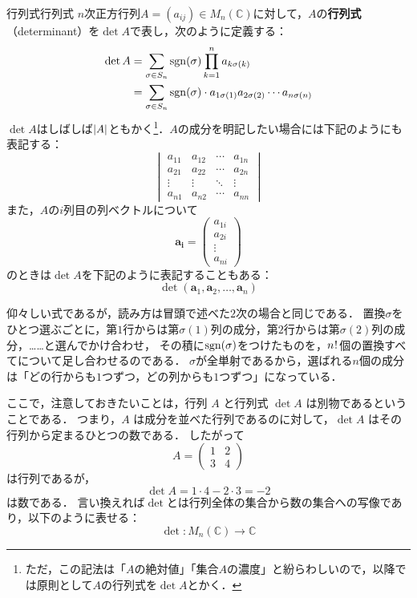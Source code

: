 \begin{definition}{行列式}{行列式}
  $n$次正方行列$A = (a_{ij}) \in M_n(\mathbb{C})$に対して，$A$の\textbf{行列式}（determinant）を$\det A $で表し，次のように定義する：
  \begin{align*}
  \det A &=\sum_{\sigma \in S_n} \sgn(\sigma) \prod_{k=1}^n a_{k\sigma(k)} \\
  &=  \sum_{\sigma \in S_n} \sgn(\sigma) \cdot a_{1\sigma(1)} a_{2\sigma(2)} \dotsm a_{n\sigma(n)}
  \end{align*}
  $\det A$はしばしば$\lvert A\rvert$ともかく\footnote{ただ，この記法は「$A$の絶対値」「集合$A$の濃度」と紛らわしいので，以降では原則として$A$の行列式を$\det A$とかく．}．$A$の成分を明記したい場合には下記のようにも表記する：
  \[
  \begin{vmatrix}
  a_{11}  & a_{12}  & \cdots & a_{1n} \\
  a_{21}  & a_{22}  & \cdots & a_{2n} \\
  \vdots  & \vdots  & \ddots & \vdots \\
  a_{n1}  & a_{n2}  & \cdots & a_{nn}
  \end{vmatrix}
  \]
  また，$A$の$i$列目の列ベクトルについて
  \[
   \bm{a_i} =\begin{pmatrix} a_{1i}\\ a_{2i}  \\ \vdots \\ a_{ni} \end{pmatrix}
  \]
  のときは$\det A$を下記のように表記することもある：
  \[
  \det(\bm{a}_1, \bm{a}_2, \dots, \bm{a}_n)
  \]
\end{definition}

仰々しい式であるが，読み方は冒頭で述べた$2$次の場合と同じである．
置換$\sigma$をひとつ選ぶごとに，第$1$行からは第$\sigma(1)$列の成分，第$2$行からは第$\sigma(2)$列の成分，……と選んでかけ合わせ，
その積に$\operatorname{sgn}(\sigma)$をつけたものを，$n\mkern1mu!\mkern1mu$個の置換すべてについて足し合わせるのである．
$\sigma$が全単射であるから，選ばれる$n$個の成分は「どの行からも$1$つずつ，どの列からも$1$つずつ」になっている．

ここで，注意しておきたいことは，行列 $A$ と行列式 $\det A$ は別物であるということである．
つまり，$A$ は成分を並べた行列であるのに対して，$\det A$ はその行列から定まるひとつの数である．
したがって
\[
A=\begin{pmatrix}
1 & 2\\
3 & 4
\end{pmatrix}
\]
は行列であるが，
\[
\det A=1\cdot4-2\cdot3=-2
\]
は数である．
言い換えれば$\det$とは行列全体の集合から数の集合への写像であり，以下のように表せる：
\[
\det \colon M_n(\mathbb{C}) \to \mathbb{C}
\]

